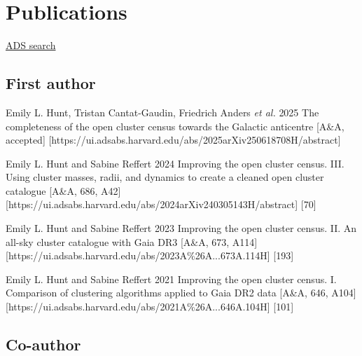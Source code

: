 \section*{Publications}

\href{\cvADSLink}{ADS search \faLink}%


\subsection*{First author}

\begin{etaremune}
    \item \publication
        {Emily L. Hunt, Tristan Cantat-Gaudin, Friedrich Anders \emph{et al.}}
        {2025}
        {The completeness of the open cluster census towards the Galactic anticentre}
        [A\&A, accepted]
        [https://ui.adsabs.harvard.edu/abs/2025arXiv250618708H/abstract]
    \item \publication
        {Emily L. Hunt and Sabine Reffert}
        {2024}
        {Improving the open cluster census. III. Using cluster masses, radii, and dynamics to create a cleaned open cluster catalogue}
        [A\&A, 686, A42]
        [https://ui.adsabs.harvard.edu/abs/2024arXiv240305143H/abstract]
        [70]
    \item \publication
        {Emily L. Hunt and Sabine Reffert}
        {2023}
        {Improving the open cluster census. II. An all-sky cluster catalogue with Gaia DR3}
        [A\&A, 673, A114]
        [https://ui.adsabs.harvard.edu/abs/2023A\%26A...673A.114H]
        [193]
    \item \publication
        {Emily L. Hunt and Sabine Reffert}
        {2021}
        {Improving the open cluster census. I. Comparison of clustering algorithms applied to Gaia DR2 data}
        [A\&A, 646, A104]
        [https://ui.adsabs.harvard.edu/abs/2021A\%26A...646A.104H]
        [101]
\end{etaremune}


\subsection*{Co-author}


